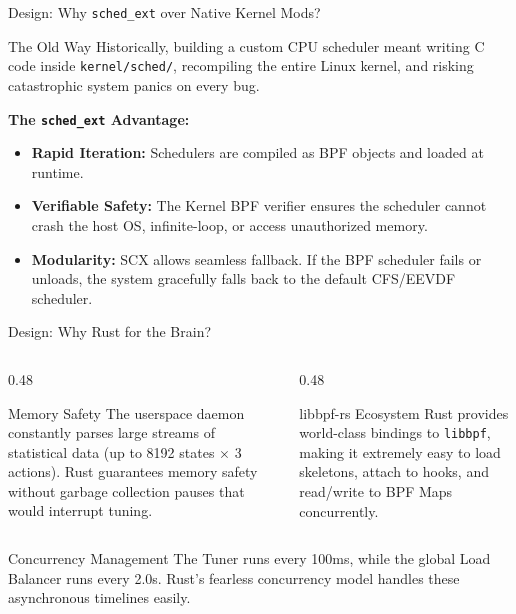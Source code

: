 \documentclass[aspectratio=169]{beamer}
\begin{document}
\begin{frame}{Design: Why \texttt{sched\_ext} over Native Kernel Mods?}
    \begin{alertblock}{The Old Way}
        Historically, building a custom CPU scheduler meant writing C code inside \texttt{kernel/sched/}, recompiling the entire Linux kernel, and risking catastrophic system panics on every bug.
    \end{alertblock}
    
    \vspace{0.3cm}
    \textbf{The \texttt{sched\_ext} Advantage:}
    \begin{itemize}
        \item \textbf{Rapid Iteration:} Schedulers are compiled as BPF objects and loaded at runtime.
        \item \textbf{Verifiable Safety:} The Kernel BPF verifier ensures the scheduler cannot crash the host OS, infinite-loop, or access unauthorized memory.
        \item \textbf{Modularity:} SCX allows seamless fallback. If the BPF scheduler fails or unloads, the system gracefully falls back to the default CFS/EEVDF scheduler.
    \end{itemize}
\end{frame}

\begin{frame}{Design: Why Rust for the Brain?}
    \begin{columns}[T]
        \begin{column}{0.48\textwidth}
            \begin{exampleblock}{Memory Safety}
                \small
                The userspace daemon constantly parses large streams of statistical data (up to 8192 states $\times$ 3 actions). Rust guarantees memory safety without garbage collection pauses that would interrupt tuning.
            \end{exampleblock}
        \end{column}

        \begin{column}{0.48\textwidth}
            \begin{block}{libbpf-rs Ecosystem}
                \small
                Rust provides world-class bindings to \texttt{libbpf}, making it extremely easy to load skeletons, attach to hooks, and read/write to BPF Maps concurrently.
            \end{block}
        \end{column}
    \end{columns}
    
    \vspace{0.3cm}
    \begin{alertblock}{Concurrency Management}
        \small
        The Tuner runs every 100ms, while the global Load Balancer runs every 2.0s. Rust's fearless concurrency model handles these asynchronous timelines easily.
    \end{alertblock}
\end{frame}
\end{document}
